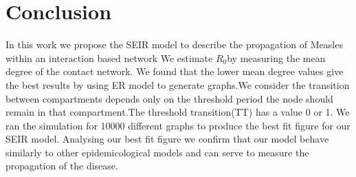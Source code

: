\documentclass[conference]{IEEEtran}
\newcommand{\ro}{$R_0$}
\begin{document}
\section{Conclusion} %
In this work we propose the SEIR model to describe the propagation of Measles within an interaction based network
We estimate \ro by measuring the mean degree of the contact network. We found that the lower mean degree values give the best results by using ER model to generate graphs.We consider the transition between compartments depends only on the threshold period the node should remain in that compartment.The threshold transition(TT) has a value 0 or 1. We ran the simulation for 10000 different graphs to produce the best fit figure for our SEIR model. Analysing our best fit figure we confirm that our model behave similarly to other epidemicological models and can serve to measure the propagation of the disease.

\printbibliography
\end{document}
